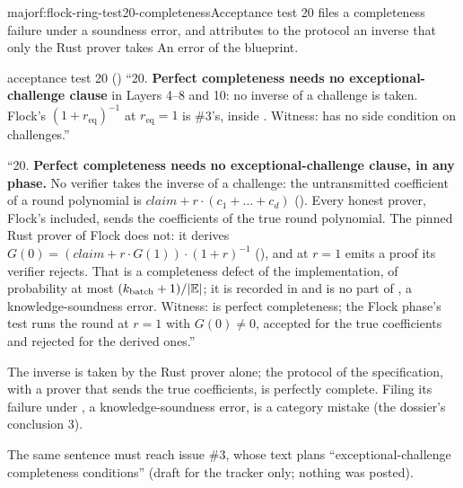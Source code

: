 \begin{finding}{major}{f:flock-ring-test20-completeness}{Acceptance test 20 files a completeness
failure under a soundness error, and attributes to the protocol an inverse that only the Rust
prover takes}
 An error of the blueprint.

\begin{change}{acceptance test 20}
\asis () \enquote{20. \textbf{Perfect completeness needs no
exceptional-challenge clause} in Layers 4--8 and 10: no inverse of a challenge is taken. Flock's
$(1 + r_{\mathrm{eq}})^{-1}$ at $r_{\mathrm{eq}} = 1$ is \#3's, inside . Witness:
 has no side condition on challenges.}

\asproposed \enquote{20. \textbf{Perfect completeness needs no exceptional-challenge clause, in
any phase.} No verifier takes the inverse of a challenge: the untransmitted coefficient of a round
polynomial is $\mathit{claim} + r·(c_1 + … + c_d)$ (). Every honest
prover, Flock's included, sends the coefficients of the true round polynomial. The pinned Rust
prover of Flock does not: it derives $G(0) = (\mathit{claim} + r·G(1))·(1 + r)^{-1}$
(), and at $r = 1$ emits a proof its verifier rejects. That is a
completeness defect of the implementation, of probability at most $(k_{\mathrm{batch}} +
1)/|\mathbb{E}|$; it is recorded in  and is no part of , a
knowledge-soundness error. Witness:  is perfect completeness; the Flock
phase's test runs the round at $r = 1$ with $G(0) ≠ 0$, accepted for the true coefficients and
rejected for the derived ones.}

\reason The inverse is taken by the Rust prover alone; the protocol of the specification, with
a prover that sends the true coefficients, is perfectly complete. Filing its failure under
, a knowledge-soundness error, is a category mistake (the dossier's conclusion 3).
\end{change}
The same sentence must reach issue \#3, whose text plans \enquote{exceptional-challenge
completeness conditions} (draft for the tracker only; nothing was posted).
\end{finding}

